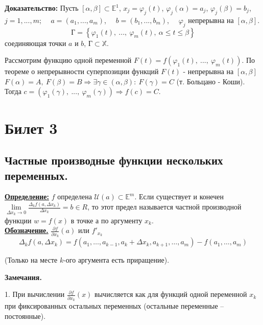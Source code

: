 \documentclass[a4paper,12pt]{article} %
\begin{document}
\textbf{Доказательство:} Пусть $[\alpha, \beta] \subset \mathbb{E}^1$, $x_j = \varphi_j(t)$, $\varphi_j(\alpha) = a_j$, $\varphi_j(\beta) = b_j$, $j = 1, ..., m$;
$\quad a = (a_1, ..., a_m)$, $\quad b = (b_1, ..., b_m)$, $\quad \varphi_j$ непрерывна на $[\alpha, \beta]$.
\[\text{Г} = \left\{\varphi_1(t),~ ..., ~\varphi_m(t), ~\alpha \leq t \leq \beta \right\}\] соединяющая точки $a$ и $b$, $\text{Г} \subset \mathbb{X}$.

Рассмотрим функцию одной переменной $F(t) = f(\varphi_1(t),~ ..., ~\varphi_m(t))$. По теореме о непрерывности суперпозиции функций $F(t)$ - непрерывна на $[\alpha, \beta]$
$F(\alpha) = A, ~ F(\beta) = B \Rightarrow \exists \gamma \in (\alpha, \beta): ~ F(\gamma) = C$ (т. Больцано - Коши). 
Тогда $c = (\varphi_1(\gamma),~ ..., ~\varphi_m(\gamma)) \Rightarrow f(c) = C.$


\newpage
\section{Билет 3}
	
\subsection{Частные производные функции нескольких переменных.}  
	
\underline{\textbf{Определение:}} $f$ определена $\mathscr{U}(a) \subset \mathds{E}^m$. Если существует и конечен $\lim\limits_{\Delta{x_k}\to 0} \frac{\Delta_k f(a, \Delta{x_k})}{\Delta{x_k}}=b \in R$, то этот предел называется частной производной функции $w = f(x)$ в точке а по аргументу $x_k$.\\
	
\underline{\textbf{Обозначение.}}  $\frac{\partial f}{\partial x_k}(a)$ или $f'_{x_k}$
\[\Delta_k f(a, \Delta{x_k}) = f(a_1, \ldots, a_{k-1}, a_k + \Delta x_k, a_{k+1}, \ldots, a_m) - f(a_1, \ldots, a_m)\] 
\begin{center}
(Только на месте $k$-ого аргумента есть приращение).\\
\end{center}

\textbf{Замечания.}
	 
	1. При вычислении  $\frac{\partial f}{\partial x_k}(x)$ вычисляется как для функций одной переменной $x_k$ при фиксированных остальных переменных (остальные переменные -- постоянные).\\
	
\end{document}
